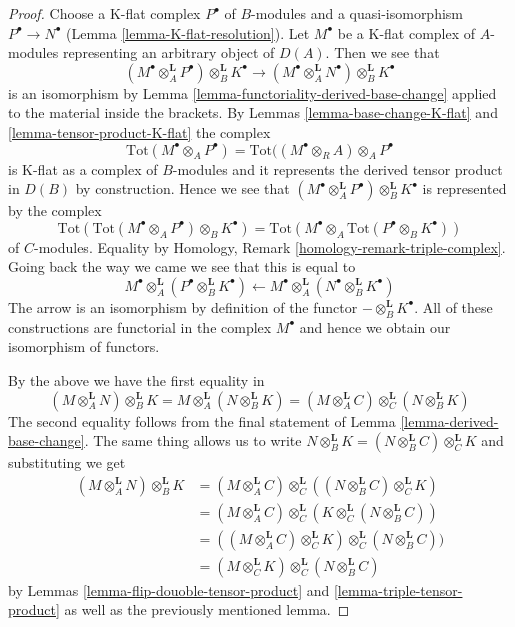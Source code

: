 \begin{proof}
Choose a K-flat complex $P^\bullet$ of $B$-modules and a quasi-isomorphism
$P^\bullet \to N^\bullet$ (Lemma \ref{lemma-K-flat-resolution}).
Let $M^\bullet$ be a K-flat complex of $A$-modules representing an
arbitrary object of $D(A)$. Then we see that
$$
(M^\bullet \otimes_A^\mathbf{L} P^\bullet) \otimes_B^\mathbf{L} K^\bullet
\longrightarrow
(M^\bullet \otimes_A^\mathbf{L} N^\bullet) \otimes_B^\mathbf{L} K^\bullet
$$
is an isomorphism by Lemma \ref{lemma-functoriality-derived-base-change}
applied to the material inside the brackets. By
Lemmas \ref{lemma-base-change-K-flat} and \ref{lemma-tensor-product-K-flat}
the complex
$$
\text{Tot}(M^\bullet \otimes_A P^\bullet) =
\text{Tot}((M^\bullet \otimes_R A) \otimes_A P^\bullet
$$
is K-flat as a complex of $B$-modules and it represents
the derived tensor product in $D(B)$ by construction.
Hence we see that
$(M^\bullet \otimes_A^\mathbf{L} P^\bullet) \otimes_B^\mathbf{L} K^\bullet$
is represented by the complex
$$
\text{Tot}(\text{Tot}(M^\bullet \otimes_A P^\bullet)\otimes_B K^\bullet) =
\text{Tot}(M^\bullet \otimes_A \text{Tot}(P^\bullet \otimes_B K^\bullet))
$$
of $C$-modules. Equality by
Homology, Remark \ref{homology-remark-triple-complex}.
Going back the way we came we see that this is equal to
$$
M^\bullet \otimes_A^\mathbf{L} (P^\bullet \otimes_B^\mathbf{L} K^\bullet)
\longleftarrow
M^\bullet \otimes_A^\mathbf{L} (N^\bullet \otimes_B^\mathbf{L} K^\bullet)
$$
The arrow is an isomorphism by definition of the functor
$-\otimes_B^\mathbf{L} K^\bullet$. All of these constructions
are functorial in the complex $M^\bullet$ and hence we obtain
our isomorphism of functors.

\medskip\noindent
By the above we have the first equality in
$$
(M \otimes_A^\mathbf{L} N) \otimes_B^\mathbf{L} K =
M \otimes_A^\mathbf{L} (N \otimes_B^\mathbf{L} K) =
(M \otimes_A^\mathbf{L} C) \otimes_C^\mathbf{L} (N \otimes_B^\mathbf{L} K)
$$
The second equality follows from the final statement of
Lemma \ref{lemma-derived-base-change}.
The same thing allows us to write
$N \otimes_B^\mathbf{L} K = (N \otimes_B^\mathbf{L} C) \otimes_C^\mathbf{L} K$
and substituting we get
\begin{align*}
(M \otimes_A^\mathbf{L} N) \otimes_B^\mathbf{L} K
& =
(M \otimes_A^\mathbf{L} C) \otimes_C^\mathbf{L}
((N \otimes_B^\mathbf{L} C) \otimes_C^\mathbf{L} K) \\
& =
(M \otimes_A^\mathbf{L} C) \otimes_C^\mathbf{L}
(K \otimes_C^\mathbf{L} (N \otimes_B^\mathbf{L} C)) \\
& =
((M \otimes_A^\mathbf{L} C) \otimes_C^\mathbf{L} K)
\otimes_C^\mathbf{L} (N \otimes_B^\mathbf{L} C)) \\
& =
(M \otimes_C^\mathbf{L} K)
\otimes_C^\mathbf{L} (N \otimes_B^\mathbf{L} C)
\end{align*}
by Lemmas \ref{lemma-flip-douoble-tensor-product} and
\ref{lemma-triple-tensor-product}
as well as the previously mentioned lemma.
\end{proof}






